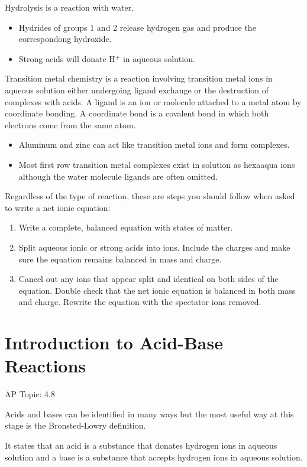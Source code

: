 \documentclass[../chem.tex]{subfiles}
\begin{document}
Hydrolysis is a reaction with water.
\begin{itemize}
    \item Hydrides of groups 1 and 2 release hydrogen gas and produce the correspondong hydroxide.
    \item Strong acids will donate H$^+$ in aqueous solution.
\end{itemize}

Transition metal chemistry is a reaction involving transition metal ions in aqueous solution either undergoing ligand exchange or the destruction 
of complexes with acids. A ligand is an ion or molecule attached to a metal atom by coordinate bonding. A coordinate bond is a covalent bond 
in which both electrons come from the same atom.
\begin{itemize}
    \item Aluminum and zinc can act like transition metal ions and form complexes.
    \item Most first row transition metal complexes exist in solution as hexaaqua ions although the water molecule ligands are often omitted.
\end{itemize}

Regardless of the type of reaction, these are steps you should follow when asked to write a net ionic equation:
\begin{enumerate}
    \item Write a complete, balanced equation with states of matter.
    \item Split aqueous ionic or strong acids into ions. Include the charges and make sure the equation remains balanced in mass and charge.
    \item Cancel out any ions that appear split and identical on both sides of the equation. Double check that the net ionic equation is balanced in both mass and charge. Rewrite the equation with the spectator ions removed.
\end{enumerate}
\section{Introduction to Acid-Base Reactions}
AP Topic: 4.8

Acids and bases can be identified in many ways but the most useful way at this stage is the Bronsted-Lowry definition.

It states that an acid is a substance that donates hydrogen ions in aqueous solution and a base is a substance that accepts hydrogen ions in aqueous solution.
\end{document}
